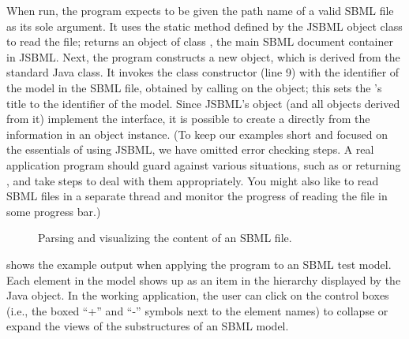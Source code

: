 When run, the program expects to be given the path name of a valid SBML
file as  its sole argument. It uses the static method
 defined by the JSBML object class \SBMLReader to read the
file; \SBMLReader returns an object of class \SBMLDocument, the main SBML
document container in JSBML.  Next, the program constructs a new
 object, which is derived from the standard Java
\JFrame class. It invokes the class constructor (line 9) with the
identifier of the model in the SBML file, obtained by calling
 on the \SBMLDocument object; this sets the
\JFrame's title to the identifier of the model.  Since JSBML's \SBase
object (and all objects derived from it) implement the \TreeNode interface,
it is possible to create a \JTree directly from the information in an
\SBMLDocument object instance.  (To keep our examples short and focused on
the essentials of using JSBML, we have omitted error checking steps.  A
real application program should guard against various situations, such as
 or  returning , and take steps
to deal with them appropriately. You might also like to read SBML files in
a separate thread and monitor the progress of reading the file in some
progress bar.)

\begin{figure}[ht]
  \caption{Parsing and visualizing the content of an SBML file.}
  \vspace*{-1.5em}
  \label{fig:JSBMLvisualizer-source}
\end{figure}


 shows the example output when
applying the program to an SBML test model.  Each
element in the model shows up as an item in the hierarchy displayed by the
Java \JTree object. In the working application, the user can click on the
control boxes (i.e., the boxed ``+'' and ``-'' symbols next to the element
names) to collapse or expand the views of the substructures of an SBML
model.


